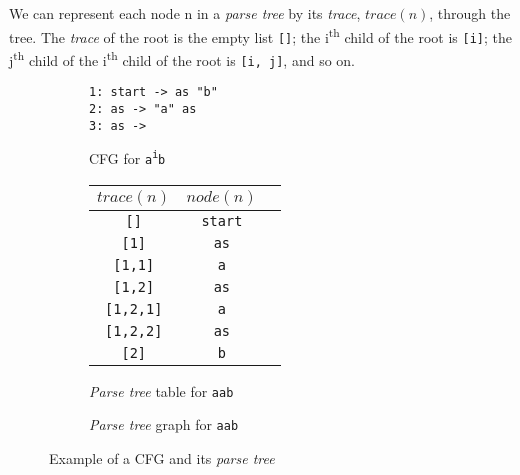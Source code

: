 \begin{definition}
We can represent each node n in a \textit{parse tree} by its \textit{trace}, $trace(n)$, through the tree. The \textit{trace} of the root is the empty list \texttt{[]}; the i\textsuperscript{th} child of the root is \texttt{[i]}; the j\textsuperscript{th} child of the i\textsuperscript{th} child of the root is \texttt{[i, j]}, and so on.
\end{definition}

\begin{figure}[H]
\begin{subfigure}{0.3\textwidth}
\texttt{1: start -> as "b" \\ 2: as -> "a" as \\ 3: as ->\\}
\caption{CFG for \texttt{a\textsuperscript{i}b}}
\end{subfigure}
\begin{subfigure}{0.34\textwidth}
\begin{table}[H]
\centering
\begin{tabular}{@{}ccc@{}}
\toprule
\textbf{$trace(n)$} & \textbf{$node(n)$} \\ \midrule
\texttt{[]} & \texttt{start} \\
\texttt{[1]} & \texttt{as} \\
\texttt{[1,1]} & \texttt{a} \\
\texttt{[1,2]} & \texttt{as} \\
\texttt{[1,2,1]} & \texttt{a} \\
\texttt{[1,2,2]} & \texttt{as} \\
\texttt{[2]} & \texttt{b} \\ \bottomrule
\end{tabular}
\end{table}
\caption{\textit{Parse tree} table for \texttt{aab}}
\end{subfigure}
\begin{subfigure}{0.34\textwidth}
\centering
{}
\caption{\textit{Parse tree} graph for \texttt{aab}}
\end{subfigure}
\caption{Example of a CFG and its \textit{parse tree}}
\label{fig:cfg_parse_tree_example}
\end{figure}

